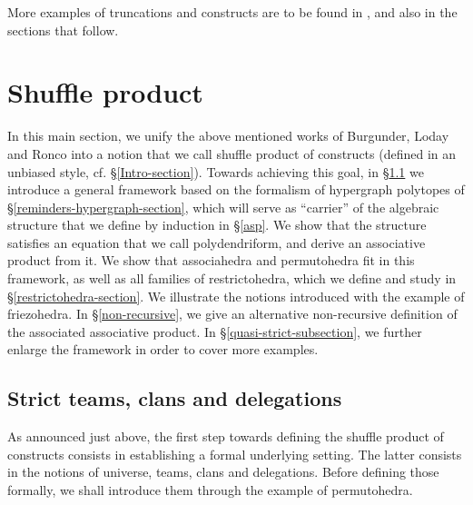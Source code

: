 \documentclass[11pt]{article}
\theoremstyle{definition}
\numberwithin{equation}{section}
\numberwithin{equation}{section}
\begin{document}
More examples of truncations and constructs are to be found in \cite{DP,COI}, and also in the sections that follow. 




\section{Shuffle product} \label{strict-teams}

In this main section, we unify the above mentioned works of Burgunder, Loday and Ronco into a notion that we call   shuffle product of constructs (defined in an unbiased style, cf. \S\ref{Intro-section}). Towards achieving this goal, in \S\ref{tcd} we introduce a general  framework based on the formalism of hypergraph polytopes of \S\ref{reminders-hypergraph-section},  which will serve as ``carrier'' of the algebraic structure that we define by induction in \S\ref{asp}. We show that the structure satisfies an equation that we call polydendriform, and derive an associative product from it. We show that associahedra and permutohedra fit in this framework, as well as all families of restrictohedra, which we define and study in \S\ref{restrictohedra-section}. We illustrate the notions introduced with the example of  friezohedra. In \S\ref{non-recursive}, we give an alternative non-recursive definition of the associated associative product. 
 In \S\ref{quasi-strict-subsection}, we further enlarge  the    framework  in order to cover more examples.
 
 \subsection{Strict teams, clans and delegations}\label{tcd} As announced just above, the first step towards defining the shuffle product of constructs  consists in establishing a formal  underlying setting. The latter consists in the notions of universe, teams, clans and delegations. Before defining those formally, we shall introduce them
through the example of permutohedra.
\end{document}
